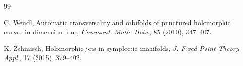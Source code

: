 \documentclass[12pt]{amsart}
\theoremstyle{definition}
\begin{document}
\begin{thebibliography} {99}



 C. Wendl, Automatic transversality and orbifolds
of punctured holomorphic curves in dimension four,  {\it Comment. Math. Helv.}, 85 (2010), 347--407.



 K. Zehmisch, Holomorphic jets in symplectic manifolds, {\it J. Fixed Point
Theory Appl.}, 17 (2015), 379--402.

\end{thebibliography}
\end{document}
